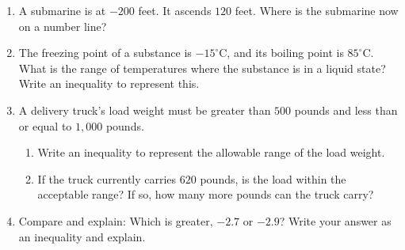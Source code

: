 \documentclass[12pt]{article}
\begin{document}
\begin{tcolorbox}[colframe=black!60, colback=white, 
coltitle=black, colbacktitle=black!15, fonttitle=\bfseries\Large, 
title=Problems, halign title=center, left=10pt, right=10pt, top=10pt, bottom=60pt]
\begin{enumerate}[start=9, itemsep=5em]
   \item A submarine is at \( -200 \) feet. It ascends \( 120 \) feet. Where is the submarine now on a number line? 



\item The freezing point of a substance is \( -15^\circ \text{C} \), and its boiling point is \( 85^\circ \text{C} \). What is the range of temperatures where the substance is in a liquid state? Write an inequality to represent this.

 

\item A delivery truck’s load weight must be greater than \( 500 \) pounds and less than or equal to \( 1,000 \) pounds. 
\begin{enumerate}
    \item Write an inequality to represent the allowable range of the load weight.
    \item If the truck currently carries \( 620 \) pounds, is the load within the acceptable range? If so, how many more pounds can the truck carry?

\end{enumerate}


    \item Compare and explain: Which is greater, \( -2.7 \) or \( -2.9 \)? Write your answer as an inequality and explain.
 
        

\end{enumerate}
\end{tcolorbox}

\vspace{1em}
\end{document}
